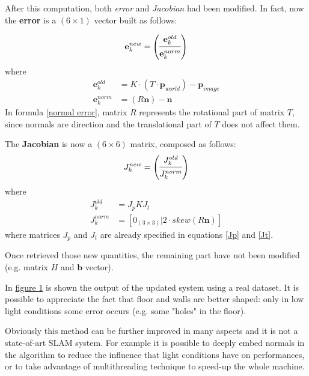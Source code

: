 \documentclass[a4paper]{article}
\begin{document}
	After this computation, both \textit{error} and \textit{Jacobian} had been modified. In fact, now the \textbf{error} is a $(6 \times 1)$ vector built as follows:
	
	\begin{equation}
		\textbf{e}_k^{new} = 
			\begin{pmatrix}
				\textbf{e}_k^{old} \\
				\cmidrule(lr){1-1}
				\textbf{e}_k^{norm}
			\end{pmatrix}
	\end{equation}
	where
	\begin{align}
		\textbf{e}_k^{old} &= K \cdot (T \cdot \textbf{p}_{world}) - \textbf{p}_{image} \\
		\textbf{e}_k^{norm} &= (R \textbf{n}) - \textbf{n}
		\label{normal error}
	\end{align}
	In formula \ref{normal error}, matrix $R$ represents the rotational part of matrix $T$, since normals are direction and the translational part of $T$ does not affect them.
	
	The \textbf{Jacobian} is now a $(6\times6)$ matrix, composed as follows:
	\begin{equation}
		J_k^{new} = 
		\begin{pmatrix}
		J_k^{old}  \\
		\cmidrule(lr){1-1}
		J_k^{norm}
		\end{pmatrix}
	\end{equation}
	where
	\begin{align}
		J_k^{old} &= J_p K J_t \\
		J_k^{norm} &= [0_{(3\times 3)} | 2 \cdot skew(R \textbf{n})]
	\end{align}
	where matrices $J_p$ and $J_t$ are already specified in equations \ref{Jp} and \ref{Jt}.
	
	Once retrieved those new quantities, the remaining part have not been modified (e.g. matrix $H$ and $\textbf{b}$ vector).
	
	In \hyperref[fig:out]{figure 1} is shown the output of the updated system using a real dataset. It is possible to appreciate the fact that floor and walls are better shaped: only in low light conditions some error occurs (e.g. some "holes" in the floor).
	
	Obviously this method can be further improved in many aspects and it is not a state-of-art SLAM system. For example it is possible to deeply embed normals in the algorithm to reduce the influence that light conditions have on performances, or to take advantage of multithreading technique to speed-up the whole machine.
	
\end{document}
